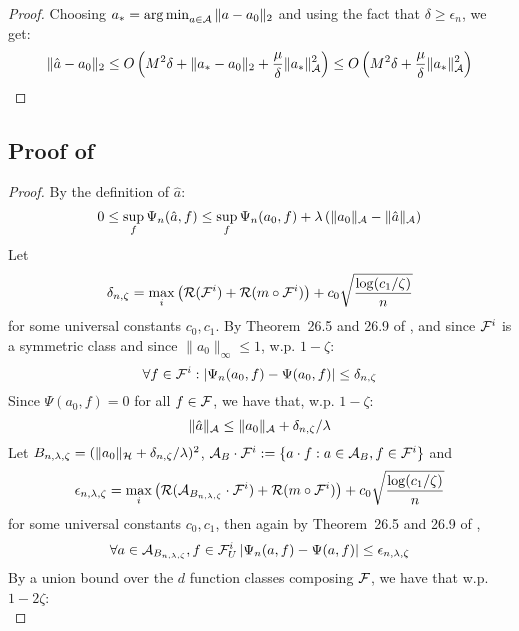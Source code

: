 \begin{proof}
Choosing $a_* = \operatorname*{arg\,min}_{a\in {\mathcal A}} \|a-a_0\|_2$ and using the fact that $\delta \geq \epsilon_n$, we get:
\begin{equation}
    \|\hat{a}-a_0\|_2 \leq O\left(M^2 \delta + \|a_*-a_0\|_2 + \frac{\mu}{\delta} \|a_*\|_{{\mathcal A}}^2\right) \leq O\left(M^2 \delta + \frac{\mu}{\delta} \|a_*\|_{{\mathcal A}}^2\right)
\end{equation}
\end{proof}


\subsection{Proof of }

\begin{proof}
By the definition of $\hat{a}$:
\begin{equation}
    0\leq \sup_{f} \Psi_n(\hat{a}, f) \leq \sup_{f} \Psi_n(a_0, f) + \lambda \left(\|a_0\|_{{\mathcal A}} - \|\hat{a}\|_{{\mathcal A}}\right)
\end{equation}
Let
\[
\delta_{n, \zeta}=\max_{i}\left({\mathcal R}({\mathcal F}^i) + {\mathcal R}(m\circ {\mathcal F}^i)\right) + c_0 \sqrt{\frac{\log(c_1/\zeta)}{n}}
\]
for some universal constants $c_0,c_1$. By Theorem~26.5 and 26.9 of \cite{shalev2014understanding}, and since ${\mathcal F}^i$ is a symmetric class and since $\|a_0\|_{\infty} \leq 1$, w.p. $1-\zeta$:
\begin{equation}
    \forall f\in {\mathcal F}^i: \left|\Psi_n(a_0, f) - \Psi(a_0, f)\right| \leq \delta_{n,\zeta}
\end{equation}
Since $\Psi(a_0, f)=0$ for all $f\in {\mathcal F}$, we have that, w.p. $1-\zeta$:
\begin{equation}
    \|\hat{a}\|_{{\mathcal A}} \leq \|a_0\|_{{\mathcal A}} + \delta_{n,\zeta}/\lambda 
\end{equation}
Let $B_{n,\lambda,\zeta} = (\|a_0\|_{{\mathcal H}} + \delta_{n,\zeta}/\lambda)^2$, ${\mathcal A}_B\cdot {\mathcal F}^i := \{a\cdot f: a\in {\mathcal A}_B, f\in {\mathcal F}^i\}$ and
\[
\epsilon_{n,\lambda, \zeta}=\max_{i}\left({\mathcal R}({\mathcal A}_{B_{n,\lambda,\zeta}}\cdot {\mathcal F}^i) + {\mathcal R}(m\circ {\mathcal F}^i)\right) + c_0 \sqrt{\frac{\log(c_1/\zeta)}{n}}
\]
for some universal constants $c_0,c_1$, then again by Theorem~26.5 and 26.9 of \cite{shalev2014understanding},
\begin{equation}
    \forall a\in {\mathcal A}_{B_{n,\lambda,\zeta}}, f\in {\mathcal F}_U^i \left|\Psi_n(a, f) - \Psi(a, f)\right| \leq \epsilon_{n,\lambda, \zeta}
\end{equation}
By a union bound over the $d$ function classes composing ${\mathcal F}$, we have that w.p. $1-2\zeta$:
\begin{equation}

\end{equation}
\end{proof}
